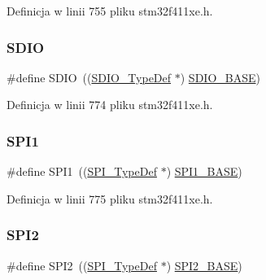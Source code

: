 Definicja w linii 755 pliku stm32f411xe.\+h.

\mbox{\label{group___peripheral__declaration_ga8149aa2760fffac16bc75216d5fd9331}} 
\subsubsection{\texorpdfstring{S\+D\+IO}{SDIO}}
{\footnotesize\ttfamily \#define S\+D\+IO~((\hyperlink{struct_s_d_i_o___type_def}{S\+D\+I\+O\+\_\+\+Type\+Def} $\ast$) \hyperlink{group___peripheral__memory__map_ga95dd0abbc6767893b4b02935fa846f52}{S\+D\+I\+O\+\_\+\+B\+A\+SE})}



Definicja w linii 774 pliku stm32f411xe.\+h.

\mbox{\label{group___peripheral__declaration_gad483be344a28ac800be8f03654a9612f}} 
\subsubsection{\texorpdfstring{S\+P\+I1}{SPI1}}
{\footnotesize\ttfamily \#define S\+P\+I1~((\hyperlink{struct_s_p_i___type_def}{S\+P\+I\+\_\+\+Type\+Def} $\ast$) \hyperlink{group___peripheral__memory__map_ga50cd8b47929f18b05efbd0f41253bf8d}{S\+P\+I1\+\_\+\+B\+A\+SE})}



Definicja w linii 775 pliku stm32f411xe.\+h.

\mbox{\label{group___peripheral__declaration_gaf2c3d8ce359dcfbb2261e07ed42af72b}} 
\subsubsection{\texorpdfstring{S\+P\+I2}{SPI2}}
{\footnotesize\ttfamily \#define S\+P\+I2~((\hyperlink{struct_s_p_i___type_def}{S\+P\+I\+\_\+\+Type\+Def} $\ast$) \hyperlink{group___peripheral__memory__map_gac3e357b4c25106ed375fb1affab6bb86}{S\+P\+I2\+\_\+\+B\+A\+SE})}




